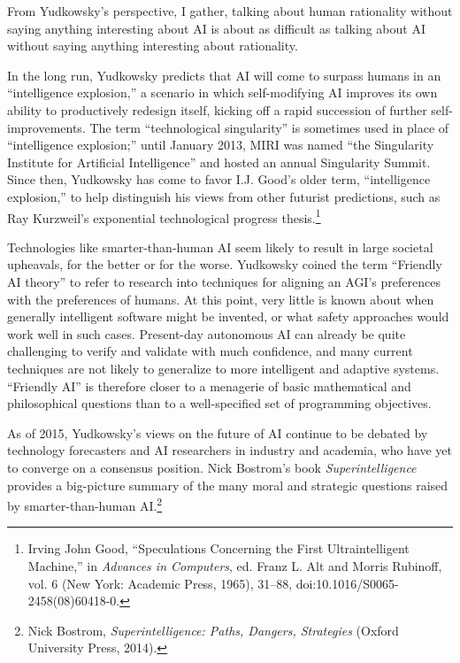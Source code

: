  From Yudkowsky's perspective, I gather, talking
about human rationality without saying anything interesting about AI is
about as difficult as talking about AI without saying anything
interesting about rationality.

{
 In the long run, Yudkowsky predicts that AI will come to surpass
humans in an ``intelligence
explosion,'' a scenario in which self-modifying AI
improves its own ability to productively redesign itself, kicking off a
rapid succession of further self-improvements. The term
``technological singularity'' is
sometimes used in place of ``intelligence
explosion;'' until January 2013, MIRI was named
``the Singularity Institute for Artificial
Intelligence'' and hosted an annual Singularity
Summit. Since then, Yudkowsky has come to favor I.J.
Good's older term, ``intelligence
explosion,'' to help distinguish his views from other
futurist predictions, such as Ray Kurzweil's
exponential technological progress thesis.\footnote{Irving John Good, ``Speculations Concerning
the First Ultraintelligent Machine,'' in
\textit{Advances in Computers}, ed. Franz L. Alt and Morris Rubinoff,
vol. 6 (New York: Academic Press, 1965), 31--88,
doi:10.1016/S0065-2458(08)60418-0.}}


 Technologies like smarter-than-human AI seem likely to result in
large societal upheavals, for the better or for the worse. Yudkowsky
coined the term ``Friendly AI
theory'' to refer to research into techniques for
aligning an AGI's preferences with the preferences of
humans. At this point, very little is known about when generally
intelligent software might be invented, or what safety approaches would
work well in such cases. Present-day autonomous AI can already be quite
challenging to verify and validate with much confidence, and many
current techniques are not likely to generalize to more intelligent and
adaptive systems. ``Friendly AI'' is
therefore closer to a menagerie of basic mathematical and philosophical
questions than to a well-specified set of programming objectives.

{
 As of 2015, Yudkowsky's views on the future of AI
continue to be debated by technology forecasters and AI researchers in
industry and academia, who have yet to converge on a consensus
position. Nick Bostrom's book
\textit{Superintelligence} provides a big-picture summary of the many
moral and strategic questions raised by smarter-than-human
AI.\footnote{Nick Bostrom, \textit{Superintelligence: Paths, Dangers,
Strategies} (Oxford University Press, 2014).}}


